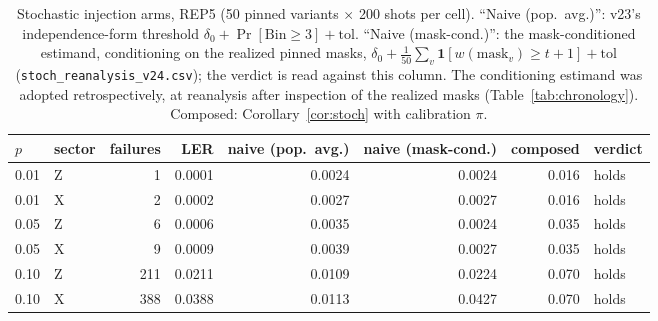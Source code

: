\documentclass[11pt,a4paper]{article}
\begin{document}
\begin{table}[H]\centering\small
\caption{Stochastic injection arms, REP5 (50 pinned variants $\times$ 200
shots per cell). ``Naive (pop.\ avg.)'': v23's independence-form
threshold $\delta_0+\Pr[\mathrm{Bin}\ge3]+\mathrm{tol}$. ``Naive
(mask-cond.)'': the mask-conditioned estimand, conditioning on the
realized pinned masks,
$\delta_0+\frac{1}{50}\sum_v\mathbf{1}[w(\mathrm{mask}_v)\ge
t{+}1]+\mathrm{tol}$ (\texttt{stoch\_reanalysis\_v24.csv}); the verdict
is read against this column. The conditioning estimand was adopted
retrospectively, at reanalysis after inspection of the realized masks
(Table~\ref{tab:chronology}). Composed: Corollary~\ref{cor:stoch} with
calibration $\pi$.}
\label{tab:injstoch}
\begin{tabular}{@{}llrrrrrl@{}}
\toprule
$p$ & sector & failures & LER & naive (pop.\ avg.) & naive
(mask-cond.) & composed & verdict \\\midrule
0.01 & Z & 1 & 0.0001 & 0.0024 & 0.0024 & 0.016 & holds \\
0.01 & X & 2 & 0.0002 & 0.0027 & 0.0027 & 0.016 & holds \\
0.05 & Z & 6 & 0.0006 & 0.0035 & 0.0024 & 0.035 & holds \\
0.05 & X & 9 & 0.0009 & 0.0039 & 0.0027 & 0.035 & holds \\
0.10 & Z & 211 & 0.0211 & 0.0109 & 0.0224 & 0.070 & holds \\
0.10 & X & 388 & 0.0388 & 0.0113 & 0.0427 & 0.070 & holds \\\bottomrule
\end{tabular}
\end{table}
\end{document}
